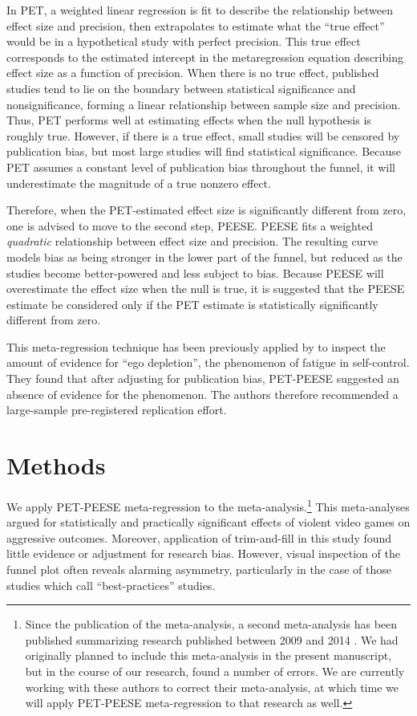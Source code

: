 \documentclass[man]{apa6}
\begin{document}
In PET, a weighted linear regression is fit to describe the relationship between effect size and precision, then extrapolates to estimate what the ``true effect'' would be in a hypothetical study with perfect precision. This true effect corresponds to the estimated intercept in the metaregression equation describing effect size as a function of precision. When there is no true effect, published studies tend to lie on the boundary between statistical significance and nonsignificance, forming a linear relationship between sample size and precision. Thus, PET performs well at estimating effects when the null hypothesis is roughly true. However, if there is a true effect, small studies will be censored by publication bias, but most large studies will find statistical significance. Because PET assumes a constant level of publication bias throughout the funnel, it will underestimate the magnitude of a true nonzero effect.

Therefore, when the PET-estimated effect size is significantly different from zero, one is advised to move to the second step, PEESE. PEESE fits a weighted {\em quadratic} relationship between effect size and precision. The resulting curve models bias as being stronger in the lower part of the funnel, but reduced as the studies become better-powered and less subject to bias. Because PEESE will overestimate the effect size when the null is true, it is suggested that the PEESE estimate be considered only if the PET estimate is statistically significantly different from zero.

This meta-regression technique has been previously applied by \citet{Carter:McCullough:2014} to inspect the amount of evidence for ``ego depletion'', the phenomenon of fatigue in self-control. They found that after adjusting for publication bias, PET-PEESE suggested an absence of evidence for the phenomenon. The authors therefore recommended a large-sample pre-registered replication effort.

\section{Methods}
We apply PET-PEESE meta-regression to the \citet{Anderson:etal:2010} meta-analysis.\footnote{Since the publication of the \citet{Anderson:etal:2010} meta-analysis, a second meta-analysis has been published summarizing research published between 2009 and 2014 \citet{Greitemeyer:Mugge:2014}. We had originally planned to include this meta-analysis in the present manuscript, but in the course of our research, found a number of errors. We are currently working with these authors to correct their meta-analysis, at which time we will apply PET-PEESE meta-regression to that research as well.} This meta-analyses argued for statistically and practically significant effects of violent video games on aggressive outcomes. Moreover, application of trim-and-fill in this study found little evidence or adjustment for research bias. 
However, visual inspection of the funnel plot often reveals alarming asymmetry, particularly in the case of those studies which \citet{Anderson:etal:2010} call ``best-practices'' studies.
\end{document}
